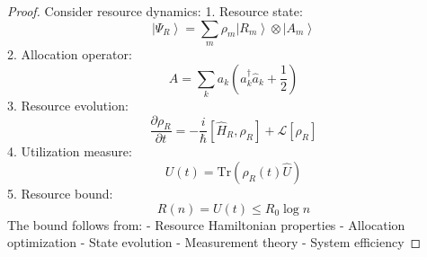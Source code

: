 \documentclass[12pt]{article}
\newcommand{\ket}[1]{\left|#1\right\rangle}
\newcommand{\tr}{\text{Tr}}
\newcommand{\op}[1]{\hat{#1}}
\begin{document}
\begin{proof}
Consider resource dynamics:
1. Resource state:
\begin{equation}
\ket{\Psi_R} = \sum_m \rho_m\ket{R_m} \otimes \ket{A_m}
\end{equation}
2. Allocation operator:
\begin{equation}
\op{A} = \sum_k a_k(\op{a}_k^\dagger\op{a}_k + \frac{1}{2})
\end{equation}
3. Resource evolution:
\begin{equation}
\frac{\partial\rho_R}{\partial t} = -\frac{i}{\hbar}[\op{H}_R,\rho_R] + \mathcal{L}[\rho_R]
\end{equation}
4. Utilization measure:
\begin{equation}
U(t) = \tr(\rho_R(t)\op{U})
\end{equation}
5. Resource bound:
\begin{equation}
R(n) = U(t) \leq R_0\log n
\end{equation}
The bound follows from:
- Resource Hamiltonian properties
- Allocation optimization
- State evolution
- Measurement theory
- System efficiency
\end{proof}
\end{document}
